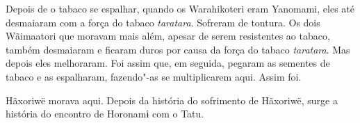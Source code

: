 Depois de o tabaco se espalhar, quando os Warahikoteri eram Yanomami,
eles até desmaiaram com a força do tabaco \emph{taratara}. Sofreram de
tontura. Os dois Wãimaatori que moravam mais além, apesar de serem
resistentes ao tabaco, também desmaiaram e ficaram duros por causa da
força do tabaco \emph{taratara}. Mas depois eles melhoraram. Foi assim
que, em seguida, pegaram as sementes de tabaco e as espalharam,
fazendo"-as se multiplicarem aqui. Assim foi.

Hãxoriwë morava aqui. Depois da história do sofrimento de Hãxoriwë,
surge a história do encontro de Horonamɨ com o Tatu.

